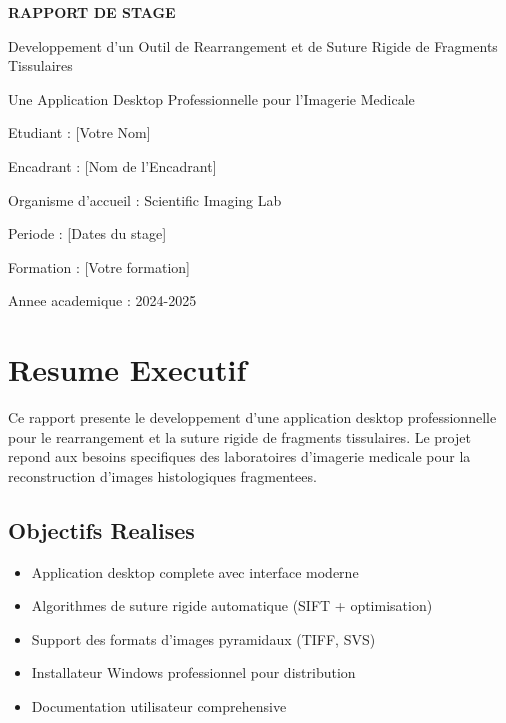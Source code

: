 \documentclass[12pt,a4paper]{article}
\begin{document}
\begin{titlepage}
\centering

\vspace*{1cm}

{\LARGE \textbf{RAPPORT DE STAGE}}

\vspace{1cm}

{\Large Developpement d'un Outil de Rearrangement et de Suture Rigide de Fragments Tissulaires}

\vspace{1.5cm}

{\large Une Application Desktop Professionnelle pour l'Imagerie Medicale}

\vspace{2cm}

{\large Etudiant : [Votre Nom]}

\vspace{0.5cm}

{\large Encadrant : [Nom de l'Encadrant]}

\vspace{0.5cm}

{\large Organisme d'accueil : Scientific Imaging Lab}

\vspace{0.5cm}

{\large Periode : [Dates du stage]}

\vspace{0.5cm}

{\large Formation : [Votre formation]}

\vspace{0.5cm}

{\large Annee academique : 2024-2025}

\vfill

\end{titlepage}

\newpage

\section*{Resume Executif}

Ce rapport presente le developpement d'une application desktop professionnelle pour le rearrangement et la suture rigide de fragments tissulaires. Le projet repond aux besoins specifiques des laboratoires d'imagerie medicale pour la reconstruction d'images histologiques fragmentees.

\subsection*{Objectifs Realises}
\begin{itemize}
\item Application desktop complete avec interface moderne
\item Algorithmes de suture rigide automatique (SIFT + optimisation)
\item Support des formats d'images pyramidaux (TIFF, SVS)
\item Installateur Windows professionnel pour distribution
\item Documentation utilisateur comprehensive
\end{itemize}
\end{document}

